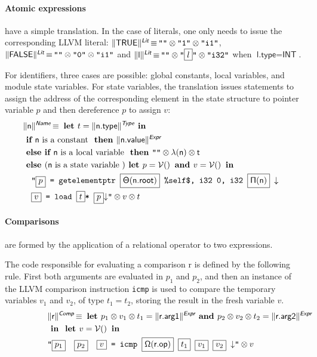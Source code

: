 \documentclass{llncs}
\newcommand{\trad}[2]{\ensuremath{\lVert \textsf{#1} \rVert^{\textit{#2}}}}
\newcommand{\nl}[0]{\ensuremath{\downarrow}}
\DeclareMathOperator{\isdef}{\equiv}
\DeclareMathOperator{\variable}{\mathcal{V}()}
\newcommand{\llvm}[1]{\texttt{#1}}
\newcommand{\B}[1]{\textsf{#1}}
\newcommand{\IF}[0]{\textbf{ if }}
\newcommand{\ELSIF}[0]{\textbf{ else if }}
\newcommand{\ELSE}[0]{\textbf{ else }}
\newcommand{\THEN}[0]{\textbf{ then }}
\newcommand{\LET}[0]{\textbf{ let }}
\newcommand{\IN}[0]{\textbf{ in }}
\newcommand{\AND}[0]{\textbf{ and }}
\newcommand{\PH}[1]{\framebox{$#1$}}
\newcommand{\sep}[0]{\otimes}
\newcommand{\local}[0]{\ensuremath{\sf\lambda}}
\newcommand{\opmap}[0]{\ensuremath{\sf\Omega}}
\newcommand{\idx}[0]{\ensuremath{\sf\Pi}}
\newcommand{\state}[0]{\ensuremath{\sf\Theta}}
\begin{document}
\paragraph{Atomic expressions} have a simple translation. In the case of
literals, one only needs to issue the corresponding LLVM literal:
$\trad{TRUE}{\B{Lit}} \isdef \llvm{""} \sep \llvm{"1"} \sep \llvm{"i1"}$,
$\trad{FALSE}{\B{Lit}} \isdef \llvm{""} \sep \llvm{"0"} \sep \llvm{"i1"}$ and
$\trad{l}{\B{Lit}} \isdef \llvm{""} \sep \llvm{"\PH{l}"} \sep \llvm{"i32"}$ when
$\B{l.type} = \B{INT}$.

For identifiers, three cases are possible: global constants, local variables,
and module state variables. For state variables, the translation issues
statements to assign the address of the corresponding element in the state
structure to pointer variable $p$ and then dereference $p$ to assign $v$:
\begin{align*}
\lefteqn{\trad{n}{\B{Name}} \isdef \LET t = \trad{n.type}{\B{Type}} \IN} \\
& \IF \B{n} \mbox{ is a constant } \THEN \trad{n.value}{\B{Expr}} \\
& \ELSIF \B{n} \mbox{ is a local variable } \THEN 
\llvm{""} \sep \local(\B{n}) \sep t \\
& \ELSE (\B{n} \mbox{ is a state variable }) \LET p = \variable \AND v = \variable \IN \\
& \quad \llvm{"\PH{p} = getelementptr \PH{\state(\B{n.root})} \%self\$, i32 0, i32 \PH{\idx(\B{n})} \nl} \\
& \quad \llvm{\PH{v} = load \PH{t}* \PH{p}\nl"} \sep v \sep t
\end{align*}

\paragraph{Comparisons} are formed by the application of a relational operator
to two expressions. 

The code responsible for evaluating a comparison \B{r} is defined by the
following rule. First both arguments are evaluated in $p_1$ and $p_2$, and then
an instance of the LLVM comparison instruction \llvm{icmp} is used to compare
the temporary variables $v_1$ and $v_2$, of type $t_1 = t_2$, storing the result
in the fresh variable $v$.
\begin{align*}
\lefteqn{\trad{r}{\B{Comp}} \isdef
  \LET
  p_1 \sep v_1 \sep t_1 = \trad{r.arg1}{\B{Expr}} \AND
  p_2 \sep v_2 \sep t_2 = \trad{r.arg2}{\B{Expr}}} \\
& \IN \LET v = \variable \IN \\
& \llvm{"\PH{p_1}\quad\PH{p_2}\quad\PH{v} = icmp \PH{\opmap(\B{r.op})} \PH{t_1} \PH{v_1} \PH{v_2} \nl"} \sep v
\end{align*}
   
\end{document}
